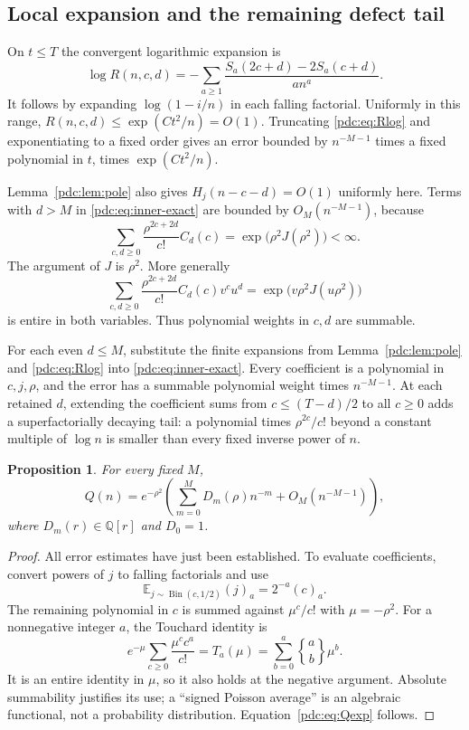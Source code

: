 \documentclass[11pt,letterpaper]{article}
\newtheorem{proposition}[theorem]{Proposition}
\theoremstyle{remark}\newtheorem{remark}[theorem]{Remark}
\newcommand{\fall}[2]{(#1)_{#2}}
\newcommand{\stirtwo}[2]{\genfrac{\{} {\}}{0pt}{}{#1}{#2}}
\newcommand{\E}{\mathbb E}
\newcommand{\Q}{\mathbb Q}
\DeclareMathOperator{\Bin}{Bin}
\begin{document}
\subsection{Local expansion and the remaining defect tail}
On $t\leq T$ the convergent logarithmic expansion is
\begin{equation}\label{pdc:eq:Rlog}
 \log R(n,c,d)
 =-\sum_{a\geq1}\frac{S_a(2c+d)-2S_a(c+d)}{a n^a}.
\end{equation}
It follows by expanding $\log(1-i/n)$ in each falling factorial. Uniformly in this range, $R(n,c,d)\leq\exp(Ct^2/n)=O(1)$. Truncating \eqref{pdc:eq:Rlog} and exponentiating to a fixed order gives an error bounded by $n^{-M-1}$ times a fixed polynomial in $t$, times $\exp(Ct^2/n)$.

Lemma~\ref{pdc:lem:pole} also gives $H_j(n-c-d)=O(1)$ uniformly here. Terms with $d>M$ in \eqref{pdc:eq:inner-exact} are bounded by $O_M(n^{-M-1})$, because
\begin{equation}\label{pdc:eq:second-majorant}
 \sum_{c,d\geq0}\frac{\rho^{2c+2d}}{c!}C_d(c)
             =\exp\bigl(\rho^2 J(\rho^2)\bigr)<\infty.
\end{equation}
The argument of $J$ is $\rho^2$. More generally
\[
 \sum_{c,d\geq0}\frac{\rho^{2c+2d}}{c!}C_d(c)v^c u^d
             =\exp\bigl(v\rho^2J(u\rho^2)\bigr)
\]
is entire in both variables. Thus polynomial weights in $c,d$ are summable.

For each even $d\leq M$, substitute the finite expansions from Lemma~\ref{pdc:lem:pole} and \eqref{pdc:eq:Rlog} into \eqref{pdc:eq:inner-exact}. Every coefficient is a polynomial in $c,j,\rho$, and the error has a summable polynomial weight times $n^{-M-1}$. At each retained $d$, extending the coefficient sums from $c\leq(T-d)/2$ to all $c\geq0$ adds a superfactorially decaying tail: a polynomial times $\rho^{2c}/c!$ beyond a constant multiple of $\log n$ is smaller than every fixed inverse power of $n$.

\begin{proposition}\label{pdc:prop:inner}
For every fixed $M$,
\begin{equation}\label{pdc:eq:Qexp}
 Q(n)=e^{-\rho^2}\left(\sum_{m=0}^M D_m(\rho)n^{-m}
                               +O_M(n^{-M-1})\right),
\end{equation}
where $D_m(r)\in\Q[r]$ and $D_0=1$.
\end{proposition}
\begin{proof}
All error estimates have just been established. To evaluate coefficients, convert powers of $j$ to falling factorials and use
\[
 \E_{j\sim\Bin(c,1/2)}\fall{j}{a}=2^{-a}\fall{c}{a}.
\]
The remaining polynomial in $c$ is summed against $\mu^c/c!$ with $\mu=-\rho^2$. For a nonnegative integer $a$, the Touchard identity is
\begin{equation}\label{pdc:eq:touchard}
 e^{-\mu}\sum_{c\geq0}\frac{\mu^c c^a}{c!}
 =T_a(\mu)=\sum_{b=0}^a\stirtwo{a}{b}\mu^b.
\end{equation}
It is an entire identity in $\mu$, so it also holds at the negative argument. Absolute summability justifies its use; a ``signed Poisson average'' is an algebraic functional, not a probability distribution. Equation~\eqref{pdc:eq:Qexp} follows.
\end{proof}
\end{document}
